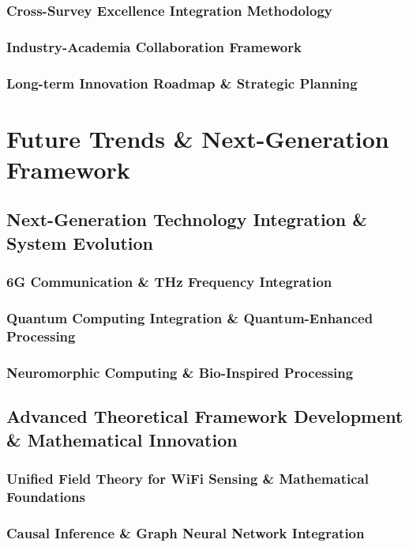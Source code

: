 \documentclass[journal]{IEEEtran}
\begin{document}
\subsubsection{Cross-Survey Excellence Integration Methodology}
\subsubsection{Industry-Academia Collaboration Framework}
\subsubsection{Long-term Innovation Roadmap \& Strategic Planning}

\section{Future Trends \& Next-Generation Framework}
\label{sec:future}

\subsection{Next-Generation Technology Integration \& System Evolution}
\subsubsection{6G Communication \& THz Frequency Integration}
\subsubsection{Quantum Computing Integration \& Quantum-Enhanced Processing}
\subsubsection{Neuromorphic Computing \& Bio-Inspired Processing}

\subsection{Advanced Theoretical Framework Development \& Mathematical Innovation}
\subsubsection{Unified Field Theory for WiFi Sensing \& Mathematical Foundations}
\subsubsection{Causal Inference \& Graph Neural Network Integration}
\end{document}
